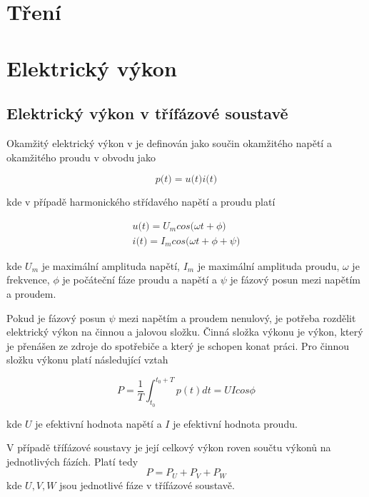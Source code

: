 \section{Tření}

\section{Elektrický výkon}
\subsection{Elektrický výkon v třífázové soustavě}
Okamžitý elektrický výkon v je definován jako součin okamžitého napětí a okamžitého proudu v obvodu jako

\begin{equation}
p\big(t\big) = u\big(t\big)i\big(t\big)
\label{el_power_eq}
\end{equation}

kde v případě harmonického střídavého napětí a proudu platí

\begin{equation}
\begin{split}
u\big(t\big) = U_m cos\big(\omega t + \phi\big) \\
i\big(t\big) = I_m cos\big(\omega t + \phi + \psi\big)
\end{split}
\label{harm_curr_volt_eq}
\end{equation}  

kde $U_m$ je maximální amplituda napětí, $I_m$ je maximální amplituda proudu, $\omega$ je frekvence, $\phi$ je počáteční fáze proudu a napětí a $\psi$ je fázový posun mezi napětím a proudem.

Pokud je fázový posun $\psi$ mezi napětím a proudem nenulový, je potřeba rozdělit elektrický výkon na činnou a jalovou složku. Činná složka výkonu je výkon, který je přenášen ze zdroje do spotřebiče a který je schopen konat práci. Pro činnou složku výkonu platí následující vztah

\begin{equation}
P = \frac{1}{T} \int_{t_0}^{t_0 + T} p(t)dt = UI cos\phi
\label{act_power_eq}
\end{equation}  

kde $U$ je efektivní hodnota napětí a $I$ je efektivní hodnota proudu.

V případě třífázové soustavy je její celkový výkon roven součtu výkonů na jednotlivých fázích. Platí tedy
\begin{equation}
P = P_U + P_V + P_W
\label{3ph_power_eq}
\end{equation}  
kde $U,V,W$ jsou jednotlivé fáze v třífázové soustavě.


